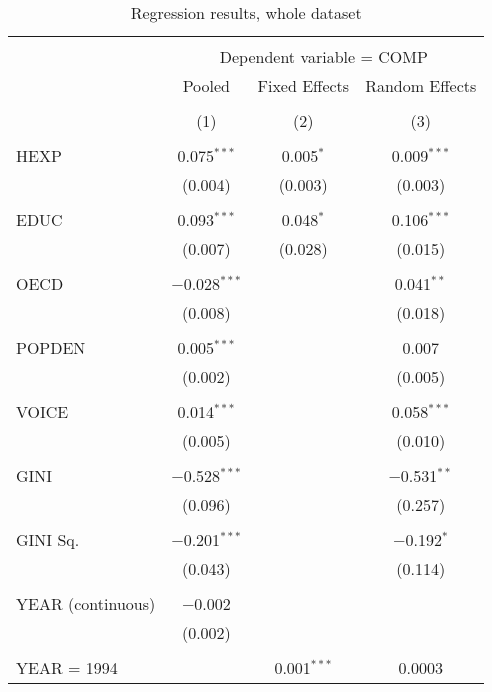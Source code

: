 \documentclass[12pt,a4paper]{article}\usepackage[]{graphicx}\usepackage[]{color}
\begin{document}
\begin{table}[!htbp] \centering 
  \caption{Regression results, whole dataset} 
  \label{tab:big} 
\begin{tabular}{@{\extracolsep{5pt}}lccc} 
\\[-1.8ex]\hline 
\hline \\[-1.8ex] 
 & \multicolumn{3}{c}{Dependent variable = COMP} \\ 
\cline{2-4} 
 & Pooled & Fixed Effects & Random Effects \\ 
\\[-1.8ex] & (1) & (2) & (3)\\ 
\hline \\[-1.8ex] 
 HEXP & 0.075$^{***}$ & 0.005$^{*}$ & 0.009$^{***}$ \\ 
  & (0.004) & (0.003) & (0.003) \\ 
  & & & \\ 
 EDUC & 0.093$^{***}$ & 0.048$^{*}$ & 0.106$^{***}$ \\ 
  & (0.007) & (0.028) & (0.015) \\ 
  & & & \\ 
 OECD & $-$0.028$^{***}$ &  & 0.041$^{**}$ \\ 
  & (0.008) &  & (0.018) \\ 
  & & & \\ 
 POPDEN & 0.005$^{***}$ &  & 0.007 \\ 
  & (0.002) &  & (0.005) \\ 
  & & & \\ 
 VOICE & 0.014$^{***}$ &  & 0.058$^{***}$ \\ 
  & (0.005) &  & (0.010) \\ 
  & & & \\ 
 GINI & $-$0.528$^{***}$ &  & $-$0.531$^{**}$ \\ 
  & (0.096) &  & (0.257) \\ 
  & & & \\ 
 GINI Sq. & $-$0.201$^{***}$ &  & $-$0.192$^{*}$ \\ 
  & (0.043) &  & (0.114) \\ 
  & & & \\ 
 YEAR (continuous) & $-$0.002 &  &  \\ 
  & (0.002) &  &  \\ 
  & & & \\ 
 YEAR = 1994 &  & 0.001$^{***}$ & 0.0003 \\ 

\end{tabular}
\end{table}
\end{document}
